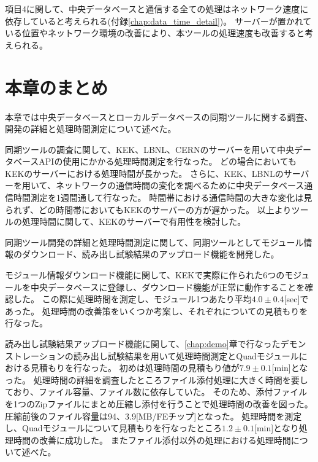 項目4に関して、中央データベースと通信する全ての処理はネットワーク速度に依存していると考えられる(付録\ref{chap:data_time_detail})。
サーバーが置かれている位置やネットワーク環境の改善により、本ツールの処理速度も改善すると考えられる。

\section{本章のまとめ}
本章では中央データベースとローカルデータベースの同期ツールに関する調査、開発の詳細と処理時間測定について述べた。

同期ツールの調査に関して、KEK、LBNL、CERNのサーバーを用いて中央データベースAPIの使用にかかる処理時間測定を行なった。
どの場合においてもKEKのサーバーにおける処理時間が長かった。
さらに、KEK、LBNLのサーバーを用いて、ネットワークの通信時間の変化を調べるために中央データベース通信時間測定を1週間通して行なった。 
時間帯における通信時間の大きな変化は見られず、どの時間帯においてもKEKのサーバーの方が遅かった。
以上よりツールの処理時間に関して、KEKのサーバーで有用性を検討した。

同期ツール開発の詳細と処理時間測定に関して、同期ツールとしてモジュール情報のダウンロード、読み出し試験結果のアップロード機能を開発した。

モジュール情報ダウンロード機能に関して、KEKで実際に作られた6つのモジュールを中央データベースに登録し、ダウンロード機能が正常に動作することを確認した。
この際に処理時間を測定し、モジュール1つあたり平均$4.0\pm 0.4$[sec]であった。
処理時間の改善策をいくつか考案し、それぞれについての見積もりを行なった。

読み出し試験結果アップロード機能に関して、\ref{chap:demo}章で行なったデモンストレーションの読み出し試験結果を用いて処理時間測定とQuadモジュールにおける見積もりを行なった。
初めは処理時間の見積もり値が$7.9\pm 0.1$[min]となった。
処理時間の詳細を調査したところファイル添付処理に大きく時間を要しており、ファイル容量、ファイル数に依存していた。
そのため、添付ファイルを1つのZipファイルにまとめ圧縮し添付を行うことで処理時間の改善を図った。
圧縮前後のファイル容量は94、3.9[MB/FEチップ]となった。
処理時間を測定し、Quadモジュールについて見積もりを行なったところ$1.2\pm 0.1$[min]となり処理時間の改善に成功した。
またファイル添付以外の処理における処理時間について述べた。

